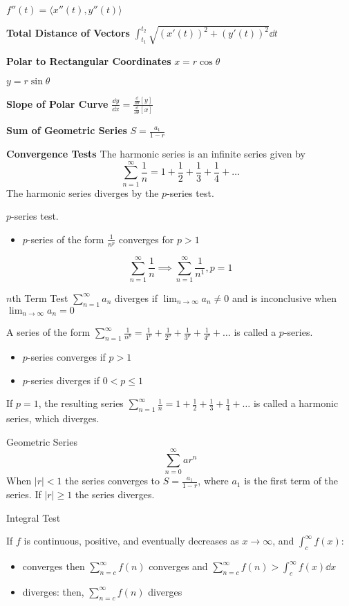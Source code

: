 \documentclass[10pt,a4paper,oneside]{book}
\begin{document}
$f''(t)=\langle x''(t),y''(t)\rangle$

\textbf{Total Distance of Vectors}
$\int_{t_1}^{t_2}\sqrt{(x'(t))^2+(y'(t))^2}\dd t$

\textbf{Polar to Rectangular Coordinates}
$x=r\cos\theta$

$y=r\sin\theta$

\textbf{Slope of Polar Curve}
$\frac{\dd y}{\dd x}=\frac{\frac{\dd}{\dd \theta}[y]}{\frac{\dd}{\dd\theta}[x]}$

\textbf{Sum of Geometric Series}
$S=\frac{a_1}{1-r}$

\textbf{Convergence Tests}
The harmonic series is an infinite series given by 
\[ \sum_{n=1}^\infty \frac{1}{n}=1+\frac{1}{2}+\frac{1}{3}+\frac{1}{4}+\dots \]
The harmonic series diverges by the $p$-series test. 

$p$-series test.
\begin{itemize}
    \item $p$-series of the form $\frac{1}{n^p}$ converges for $p>1$
\end{itemize}
\[ \sum_{n=1}^\infty \frac{1}{n}\implies \sum_{n=1}^\infty \frac{1}{n^1}, p=1\]

$n$th Term Test 
$\sum_{n=1}^\infty a_n$ diverges if $\lim_{n\to \infty}a_n \neq 0$ and is inconclusive when $\lim_{n\to\infty}a_n=0$

A series of the form $\sum_{n=1}^\infty \frac{1}{n^p}=\frac{1}{1^p}+\frac{1}{2^p}+\frac{1}{3^p}+\frac{1}{4^p}+\dots$ is called a $p$-series.
\begin{itemize}
    \item $p$-series converges if $p>1$
    \item $p$-series diverges if $0<p\leq 1$
\end{itemize}
If $p=1$, the resulting series $\sum_{n=1}^\infty \frac{1}{n}=1+\frac{1}{2}+\frac{1}{3}+\frac{1}{4}+\dots$ is called a harmonic series, which diverges.

Geometric Series 
\[ \sum_{n=0}^\infty ar^n \]
When $|r|<1$ the series converges to $S=\frac{a_1}{1-r}$, where $a_1$ is the first term of the series. If $|r|\geq 1$ the series diverges.

Integral Test

If $f$ is continuous, positive, and eventually decreases as $x\rightarrow \infty$, and $\int_c^\infty f(x)$:
\begin{itemize}
    \item converges then $\sum_{n=c}^\infty f(n)$ converges and $\sum_{n=c}^\infty f(n)>\int_c^\infty f(x)\dd x$
    \item diverges: then, $\sum_{n=c}^\infty f(n)$ diverges 
\end{itemize}
\end{document}
